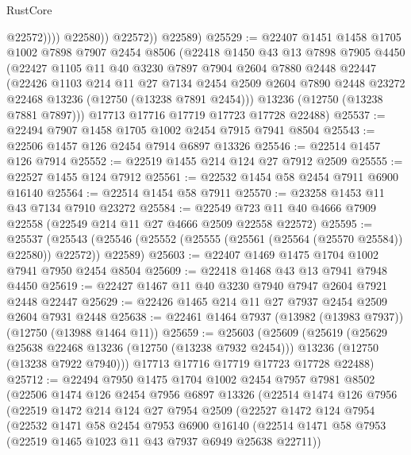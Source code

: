 \begin{lexlean}{RustCore}
\begin{coremodule}
                      @22572))))
              @22580))
          @22572))
      @22589)
@25529 := @22407
    @1451
    @1458
    @1705
    @1002
    @7898
    @7907
    @2454
    @8506
    (@22418
      @1450
      @43
      @13
      @7898
      @7905
      @4450
      (@22427
        @1105
        @11
        @40
        @3230
        @7897
        @7904
        @2604
        @7880
        @2448
        @22447
        (@22426
          @1103
          @214
          @11
          @27
          @7134
          @2454
          @2509
          @2604
          @7890
          @2448
          @23272
          @22468
          @13236
          (@12750 (@13238 @7891 @2454)))
        @13236
        (@12750 (@13238 @7881 @7897)))
      @17713
      @17716
      @17719
      @17723
      @17728
      @22488)
@25537 := @22494 @7907 @1458 @1705 @1002 @2454 @7915 @7941 @8504
@25543 := @22506 @1457 @126 @2454 @7914 @6897 @13326
@25546 := @22514 @1457 @126 @7914
@25552 := @22519 @1455 @214 @124 @27 @7912 @2509
@25555 := @22527 @1455 @124 @7912
@25561 := @22532 @1454 @58 @2454 @7911 @6900 @16140
@25564 := @22514 @1454 @58 @7911
@25570 := @23258 @1453 @11 @43 @7134 @7910 @23272
@25584 := @22549 @723 @11 @40 @4666 @7909 @22558 (@22549 @214 @11 @27 @4666 @2509 @22558 @22572)
@25595 := @25537
    (@25543 (@25546 (@25552 (@25555 (@25561 (@25564 (@25570 @25584)) @22580)) @22572)) @22589)
@25603 := @22407 @1469 @1475 @1704 @1002 @7941 @7950 @2454 @8504
@25609 := @22418 @1468 @43 @13 @7941 @7948 @4450
@25619 := @22427 @1467 @11 @40 @3230 @7940 @7947 @2604 @7921 @2448 @22447
@25629 := @22426 @1465 @214 @11 @27 @7937 @2454 @2509 @2604 @7931 @2448
@25638 := @22461 @1464 @7937 (@13982 (@13983 @7937)) (@12750 (@13988 @1464 @11))
@25659 := @25603
    (@25609
      (@25619
        (@25629 @25638 @22468 @13236 (@12750 (@13238 @7932 @2454)))
        @13236
        (@12750 (@13238 @7922 @7940)))
      @17713
      @17716
      @17719
      @17723
      @17728
      @22488)
@25712 := @22494
    @7950
    @1475
    @1704
    @1002
    @2454
    @7957
    @7981
    @8502
    (@22506
      @1474
      @126
      @2454
      @7956
      @6897
      @13326
      (@22514
        @1474
        @126
        @7956
        (@22519
          @1472
          @214
          @124
          @27
          @7954
          @2509
          (@22527
            @1472
            @124
            @7954
            (@22532
              @1471
              @58
              @2454
              @7953
              @6900
              @16140
              (@22514 @1471 @58 @7953 (@22519 @1465 @1023 @11 @43 @7937 @6949 @25638 @22711))

\end{coremodule}
\end{lexlean}
